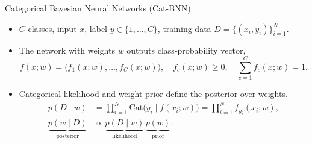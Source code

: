 \begin{frame}{Categorical Bayesian Neural Networks (Cat-BNN)}
\label{frm:bg-categorical-bnn}
\setlength{\abovedisplayskip}{4pt}
\setlength{\belowdisplayskip}{4pt}
\setlength{\abovedisplayshortskip}{4pt}
\setlength{\belowdisplayshortskip}{4pt}
\begin{itemize}
\setlength{\itemsep}{4mm}
\item $C$ classes, input $x$, label $y\in\{1,\ldots,C\}$,
training data $D=\{(x_i,y_i)\}_{i=1}^{N}$.

\item The network with weights $w$ outputs class-probability vector,
\[
f(x;w)=\bigl(f_1(x;w),\ldots,f_C(x;w)\bigr),
\quad f_c(x;w)\geq0,\quad \sum_{c=1}^{C}f_c(x;w)=1.
\]

\item<2-> Categorical likelihood and weight prior define the posterior over weights.
\begin{align*}
p(D\mid w)&=\prod_{i=1}^{N}\mathrm{Cat}\bigl(y_i\mid f(x_i;w)\bigr)
=\prod_{i=1}^{N}f_{y_i}(x_i;w),\\[2mm]
\underbrace{p(w\mid D)}_{\text{posterior}}
&\propto\underbrace{p(D\mid w)}_{\text{likelihood}}\,
\underbrace{p(w)}_{\text{prior}}.
\end{align*}
\end{itemize}
\end{frame}

